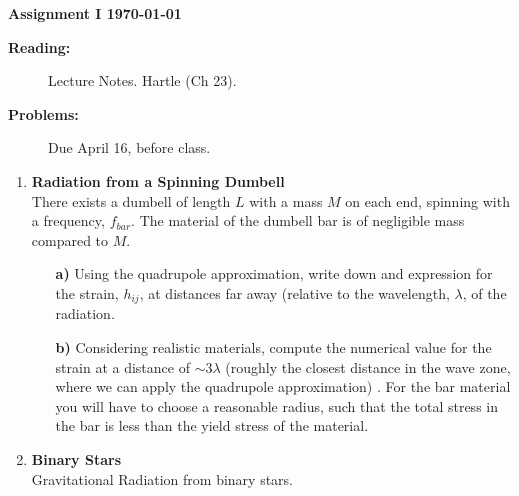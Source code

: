 \documentclass[11pt]{article}
\newcommand{\zach}[1]{\textcolor{ForestGreen}{#1}}
\begin{document}
%
\centerline{\large\bf  \hfill Assignment I \hfill  \today}

\medskip
\begin{description}
\item[{\bf Reading:}] Lecture Notes. Hartle (Ch 23). \\
\item[{\bf Problems:} \hfill ] Due April 16, before class.
\end{description}


\medskip

\begin{enumerate}

\item
{\bf Radiation from a Spinning Dumbell} \\
There exists a dumbell of length $L$ with a mass $M$ on each end,
spinning with a frequency, $f_{bar}$. The
material of the dumbell bar is of negligible mass compared to $M$.
\begin{itemize}

\item[\bf a)] Using the quadrupole approximation, write down and
  expression for the strain, $h_{ij}$, at distances far away (relative to the
  wavelength, $\lambda$, of the radiation.
  

\item[\bf b)] Considering realistic materials, compute the numerical
  value for the strain at a distance of $\sim 3 \lambda$ (roughly the closest distance in the wave zone, where we can apply the quadrupole approximation) . For the bar
  material you will have to choose a reasonable radius, such that the
  total stress in the bar is less than the yield stress of the
  material. 
  

\end{itemize}

\item
{\bf Binary Stars} \\
Gravitational Radiation from binary stars.
\begin{itemize}


\end{itemize}
\end{enumerate}
\end{document}
